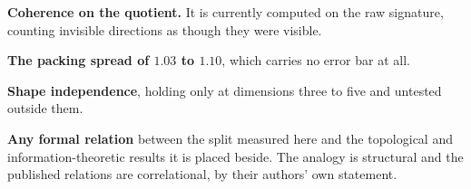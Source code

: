 \textbf{Coherence on the quotient.} It is currently computed on the raw signature, counting invisible directions as though they were visible.

\textbf{The packing spread of \(1.03\) to \(1.10\)}, which carries no error bar at all.

\textbf{Shape independence}, holding only at dimensions three to five and untested outside them.

\textbf{Any formal relation} between the split measured here and the topological and information-theoretic results it is placed beside. The analogy is structural and the published relations are correlational, by their authors' own statement.
